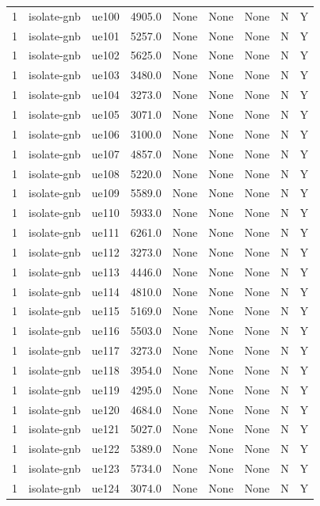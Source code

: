 \begin{table}[ht]
\begin{tabular}{|c|c|c|c|c|c|c|c|c|}
1 & isolate-gnb & ue100 & 4905.0 & None & None & None & N & Y \\
1 & isolate-gnb & ue101 & 5257.0 & None & None & None & N & Y \\
1 & isolate-gnb & ue102 & 5625.0 & None & None & None & N & Y \\
1 & isolate-gnb & ue103 & 3480.0 & None & None & None & N & Y \\
1 & isolate-gnb & ue104 & 3273.0 & None & None & None & N & Y \\
1 & isolate-gnb & ue105 & 3071.0 & None & None & None & N & Y \\
1 & isolate-gnb & ue106 & 3100.0 & None & None & None & N & Y \\
1 & isolate-gnb & ue107 & 4857.0 & None & None & None & N & Y \\
1 & isolate-gnb & ue108 & 5220.0 & None & None & None & N & Y \\
1 & isolate-gnb & ue109 & 5589.0 & None & None & None & N & Y \\
1 & isolate-gnb & ue110 & 5933.0 & None & None & None & N & Y \\
1 & isolate-gnb & ue111 & 6261.0 & None & None & None & N & Y \\
1 & isolate-gnb & ue112 & 3273.0 & None & None & None & N & Y \\
1 & isolate-gnb & ue113 & 4446.0 & None & None & None & N & Y \\
1 & isolate-gnb & ue114 & 4810.0 & None & None & None & N & Y \\
1 & isolate-gnb & ue115 & 5169.0 & None & None & None & N & Y \\
1 & isolate-gnb & ue116 & 5503.0 & None & None & None & N & Y \\
1 & isolate-gnb & ue117 & 3273.0 & None & None & None & N & Y \\
1 & isolate-gnb & ue118 & 3954.0 & None & None & None & N & Y \\
1 & isolate-gnb & ue119 & 4295.0 & None & None & None & N & Y \\
1 & isolate-gnb & ue120 & 4684.0 & None & None & None & N & Y \\
1 & isolate-gnb & ue121 & 5027.0 & None & None & None & N & Y \\
1 & isolate-gnb & ue122 & 5389.0 & None & None & None & N & Y \\
1 & isolate-gnb & ue123 & 5734.0 & None & None & None & N & Y \\
1 & isolate-gnb & ue124 & 3074.0 & None & None & None & N & Y \\

\end{tabular}
\end{table}
